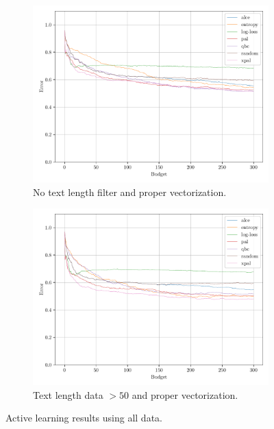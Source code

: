 \begin{figure}[h]
    \centering
    \begin{subfigure}{0.49\textwidth}
        \includegraphics[width=\textwidth]{../img/plot_text_data_all_proper_vectorizer_test_results.pdf}
        \caption{No text length filter and proper vectorization.}
        \label{fig:probal_all_proper_vect}
    \end{subfigure}
    \hfill
    \begin{subfigure}{0.49\textwidth}
        \includegraphics[width=\textwidth]{../img/plot_text_data_all_proper_vectorizer_50_st_filter_test_results.pdf}
        \caption{Text length data $>50$ and proper vectorization.}
        \label{fig:probal_all_proper_vect_50_st_filter}
    \end{subfigure}
    \caption{Active learning results using all data.}
\end{figure}


